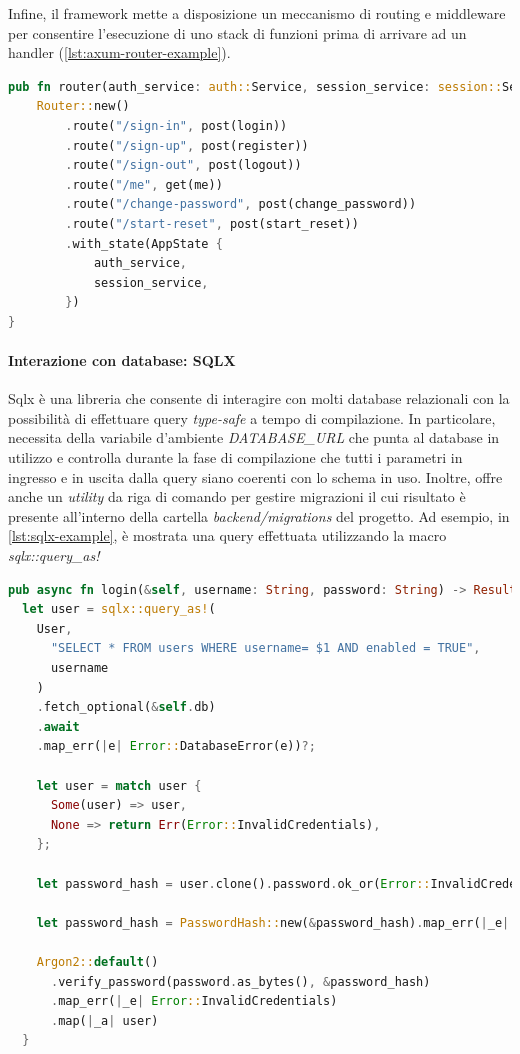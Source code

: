 \documentclass{article}
\begin{document}
Infine, il framework mette a disposizione un meccanismo di routing e middleware per consentire 
l'esecuzione di uno stack di funzioni prima di arrivare ad un handler (\cref{lst:axum-router-example}). 

\begin{lstlisting}[language=Rust, style=boxed, label={lst:axum-router-example}, captionpos=b,caption={Esempio di router in Axum}]
pub fn router(auth_service: auth::Service, session_service: session::Service) -> Router {
    Router::new()
        .route("/sign-in", post(login))
        .route("/sign-up", post(register))
        .route("/sign-out", post(logout))
        .route("/me", get(me))
        .route("/change-password", post(change_password))
        .route("/start-reset", post(start_reset))
        .with_state(AppState {
            auth_service,
            session_service,
        })
}
\end{lstlisting}

\paragraph{Interazione con database: SQLX} Sqlx è una libreria che consente di interagire 
con molti database relazionali con la possibilità di effettuare query \textit{type-safe}
a tempo di compilazione. In particolare, necessita della variabile d'ambiente
\textit{DATABASE\_URL} che punta al database in utilizzo e controlla durante la fase di 
compilazione che tutti i parametri in ingresso e in uscita dalla query siano coerenti con lo 
schema in uso. Inoltre, offre anche un \textit{utility} da riga di comando per gestire migrazioni 
il cui risultato è presente all'interno della cartella \textit{backend/migrations} del progetto. 
Ad esempio, in \cref{lst:sqlx-example}, è mostrata una query effettuata utilizzando la macro \textit{sqlx::query\_as!}

\begin{lstlisting}[language=Rust, style=boxed, label={lst:sqlx-example}, captionpos=b,caption={Esempio di query in Rust con SQLX}]
pub async fn login(&self, username: String, password: String) -> Result<User> {
  let user = sqlx::query_as!(
    User,
      "SELECT * FROM users WHERE username= $1 AND enabled = TRUE",
      username
    )
    .fetch_optional(&self.db)
    .await
    .map_err(|e| Error::DatabaseError(e))?;

    let user = match user {
      Some(user) => user,
      None => return Err(Error::InvalidCredentials),
    };

    let password_hash = user.clone().password.ok_or(Error::InvalidCredentials)?;

    let password_hash = PasswordHash::new(&password_hash).map_err(|_e| Error::CryptoError)?;

    Argon2::default()
      .verify_password(password.as_bytes(), &password_hash)
      .map_err(|_e| Error::InvalidCredentials)
      .map(|_a| user)
  }

\end{lstlisting}
\end{document}

